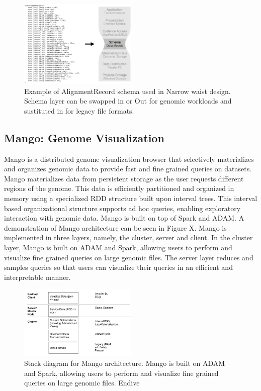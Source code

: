 \documentclass{sig-alternate-05-2015}
\begin{document}
\begin{figure}
  \label{fig:adam}
  \includegraphics[width=0.5\textwidth]{figures/adamSchema.png}
  \caption{Example of AlignmentRecord schema used in
  Narrow waist design. Schema layer can be swapped in or
  Out for genomic workloads and sustituted in for legacy file formats.}
\end{figure}

\subsection{Mango: Genome Visualization}
Mango is a distributed genome visualization browser that selectively materializes and organizes genomic data to provide fast and fine grained queries on datasets. Mango materializes data from persistent storage as the user requests different regions of the genome. This data is efficiently partitioned and organized in memory using a specialized RDD structure built upon interval trees. This interval based organizational structure supports ad hoc queries, enabling exploratory interaction with genomic data.  Mango is built on top of Spark and ADAM. A demonstration of Mango architecture can be seen in Figure X. Mango is implemented in three layers, namely, the cluster, server and client. In the cluster layer, Mango is built on ADAM and Spark, allowing users to perform and visualize fine grained queries on large genomic files. The server layer reduces and samples queries so that users can visualize their queries in an efficient and interpretable manner.


\begin{figure}
  \label{fig:mango}
  \includegraphics[width=0.5\textwidth]{figures/mango.png}
  \caption{Stack diagram for Mango architecture. Mango is built on ADAM and Spark, allowing users to perform and visualize fine grained queries on large genomic files.
  Endive}
\end{figure}
\end{document}
